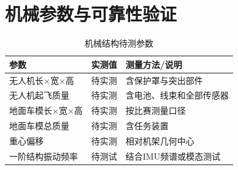 
\section{机械参数与可靠性验证}

\begin{table}[htbp]
  \centering
  \caption{机械结构待测参数}
  \begin{tabularx}{\textwidth}{p{4.3cm}p{3.2cm}X}
    \toprule
    参数 & 实测值 & 测量方法/说明 \\
    \midrule
    无人机长×宽×高 & 待实测 & 含保护罩与突出部件 \\
    无人机起飞质量 & 待实测 & 含电池、线束和全部传感器 \\
    地面车模长×宽×高 & 待实测 & 按比赛测量口径 \\
    地面车模总质量 & 待实测 & 含任务装置 \\
    重心偏移 & 待实测 & 相对机架几何中心 \\
    一阶结构振动频率 & 待测试 & 结合IMU频谱或模态测试 \\
    \bottomrule
  \end{tabularx}
\end{table}
